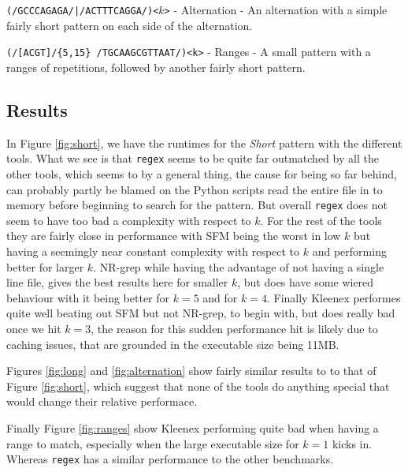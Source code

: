 \texttt{(/GCCCAGAGA/|/ACTTTCAGGA/)<$k$>} - Alternation - An alternation with a
simple fairly short pattern on each side of the alternation.

\texttt{(/[ACGT]/\{5,15\} /TGCAAGCGTTAAT/)<k>} - Ranges - A small pattern with
a ranges of repetitions, followed by another fairly short pattern.

\subsection{Results}
In Figure \ref{fig:short}, we have the runtimes for the \textit{Short} pattern
with the different tools. What we see is that \texttt{regex} seems to be quite
far outmatched by all the other tools, which seems to by a general thing, the
cause for being so far behind, can probably partly be blamed on the Python
scripts read the entire file in to memory before beginning to search for the
pattern. But overall \texttt{regex} does not seem to have too bad a complexity
with respect to $k$. For the rest of the tools they are fairly close in
performance with SFM being the worst in low $k$ but having a seemingly near
constant complexity with respect to $k$ and performing better for larger $k$.
NR-grep while having the advantage of not having a single line file, gives the
best results here for smaller $k$, but does have some wiered behaviour with it
being better for $k=5$ and for $k=4$. Finally Kleenex performes quite well
beating out SFM but not NR-grep, to begin with, but does really bad once we hit
$k=3$, the reason for this sudden performance hit is likely due to caching
issues, that are grounded in the executable size being 11MB.

Figures \ref{fig:long} and \ref{fig:alternation} show fairly similar results to
to that of Figure \ref{fig:short}, which suggest that none of the tools do
anything special that would change their relative performace.

Finally Figure \ref{fig:ranges} show Kleenex performing quite bad when having a
range to match, especially when the large executable size for $k=1$ kicks in.
Whereas \texttt{regex} has a similar performance to the other benchmarks.

